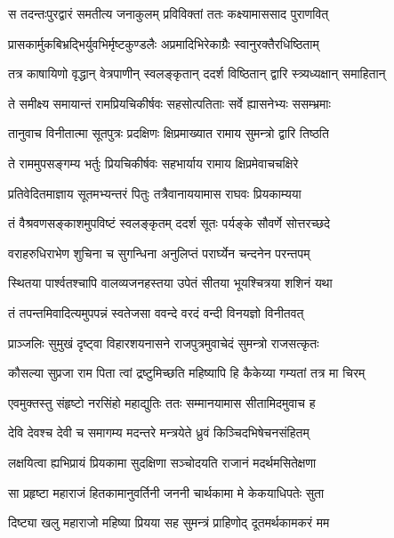 
\twolineshloka
{स तदन्तःपुरद्वारं समतीत्य जनाकुलम्}
{प्रविविक्तां ततः कक्ष्यामाससाद पुराणवित्} %

\twolineshloka
{प्रासकार्मुकबिभ्रद्भिर्युवभिर्मृष्टकुण्डलैः}
{अप्रमादिभिरेकाग्रैः स्वानुरक्तैरधिष्ठिताम्} %

\twolineshloka
{तत्र काषायिणो वृद्धान् वेत्रपाणीन् स्वलङ्कृतान्}
{ददर्श विष्ठितान् द्वारि स्त्र्यध्यक्षान् समाहितान्} %

\twolineshloka
{ते समीक्ष्य समायान्तं रामप्रियचिकीर्षवः}
{सहसोत्पतिताः सर्वे ह्यासनेभ्यः ससम्भ्रमाः} %

\twolineshloka
{तानुवाच विनीतात्मा सूतपुत्रः प्रदक्षिणः}
{क्षिप्रमाख्यात रामाय सुमन्त्रो द्वारि तिष्ठति} %

\twolineshloka
{ते राममुपसङ्गम्य भर्तुः प्रियचिकीर्षवः}
{सहभार्याय रामाय क्षिप्रमेवाचचक्षिरे} %

\twolineshloka
{प्रतिवेदितमाज्ञाय सूतमभ्यन्तरं पितुः}
{तत्रैवानाययामास राघवः प्रियकाम्यया} %

\twolineshloka
{तं वैश्रवणसङ्काशमुपविष्टं स्वलङ्कृतम्}
{ददर्श सूतः पर्यङ्के सौवर्णे सोत्तरच्छदे} %

\twolineshloka
{वराहरुधिराभेण शुचिना च सुगन्धिना}
{अनुलिप्तं परार्घ्येन चन्दनेन परन्तपम्} %

\twolineshloka
{स्थितया पार्श्वतश्चापि वालव्यजनहस्तया}
{उपेतं सीतया भूयश्चित्रया शशिनं यथा} %

\twolineshloka
{तं तपन्तमिवादित्यमुपपन्नं स्वतेजसा}
{ववन्दे वरदं वन्दी विनयज्ञो विनीतवत्} %

\twolineshloka
{प्राञ्जलिः सुमुखं दृष्ट्वा विहारशयनासने}
{राजपुत्रमुवाचेदं सुमन्त्रो राजसत्कृतः} %

\twolineshloka
{कौसल्या सुप्रजा राम पिता त्वां द्रष्टुमिच्छति}
{महिष्यापि हि कैकेय्या गम्यतां तत्र मा चिरम्} %

\twolineshloka
{एवमुक्तस्तु संहृष्टो नरसिंहो महाद्युतिः}
{ततः सम्मानयामास सीतामिदमुवाच ह} %

\twolineshloka
{देवि देवश्च देवी च समागम्य मदन्तरे}
{मन्त्रयेते ध्रुवं किञ्चिदभिषेचनसंहितम्} %

\twolineshloka
{लक्षयित्वा ह्यभिप्रायं प्रियकामा सुदक्षिणा}
{सञ्चोदयति राजानं मदर्थमसितेक्षणा} %

\twolineshloka
{सा प्रहृष्टा महाराजं हितकामानुवर्तिनी}
{जननी चार्थकामा मे केकयाधिपतेः सुता} %

\twolineshloka
{दिष्ट्या खलु महाराजो महिष्या प्रियया सह}
{सुमन्त्रं प्राहिणोद् दूतमर्थकामकरं मम} %

